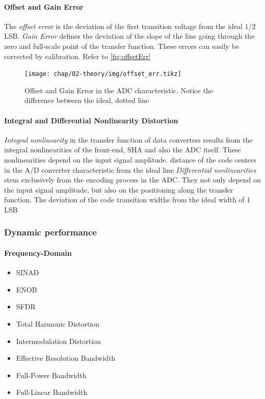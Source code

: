 \paragraph{Offset and Gain Error}
The \textit{offset error} is the deviation of the first transition voltage from the ideal $1/2$ LSB. \textit{Gain Error} defines the deviation of the slope of the line going through the zero and full-scale point of the transfer function. These errors can easily be corrected by calibration. Refer to \autoref{fig:offsetErr}

\begin{figure}[H]
	\centering
	\texttt{[image: chap/02-theory/img/offset\_err.tikz]}
	\caption{Offset and Gain Error in the ADC characteristic. Notice the difference between the ideal, dotted line}
	\label{fig:offsetErr}
\end{figure}


\paragraph{Integral and Differential Nonlinearity Distortion} 
\textit{Integral nonlinearity} in the transfer function of data converters results from the integral nonlinearities of the front-end, SHA and also the ADC itself. These nonlinearities depend on the input signal amplitude. distance of the code centers in the A/D converter characteristic from the ideal line
\textit{Differential nonlinearities} stem exclusively from the encoding process in the ADC. They not only depend on the input signal amplitude, but also on the positioning along the transfer function. The deviation of the code transition widths from the ideal width
of 1 LSB




\subsubsection{Dynamic performance}
\paragraph{Frequency-Domain}
\begin{itemize}
	\item SINAD
	\item ENOB
	\item SFDR
	\item Total Harmonic Distortion
	\item Intermodulation Distortion
	\item Effective Resolution Bandwidth
	\item Full-Power Bandwidth
	\item Full-Linear Bandwidth
\end{itemize}

